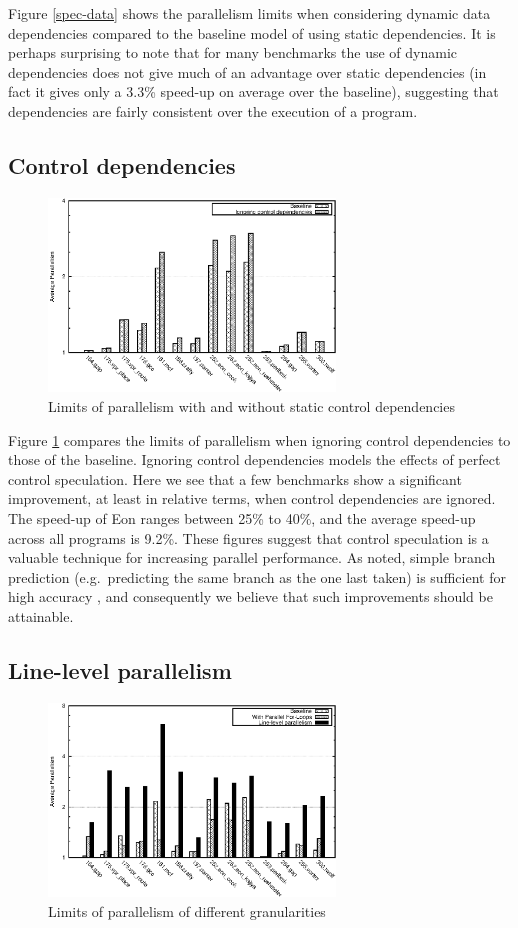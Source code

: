 Figure \ref{spec-data} shows the parallelism limits when considering dynamic data dependencies compared to the baseline model of using static dependencies.
It is perhaps surprising to note that for many benchmarks the use of dynamic dependencies does not give much of an advantage over static dependencies (in fact it gives only a 3.3\% speed-up on average over the baseline), suggesting that dependencies are fairly consistent over the execution of a program.

\subsection{Control dependencies}

\begin{figure}
 \centering
 \includegraphics[width=3in]{spec-ctl}
 \caption{Limits of parallelism with and without static control dependencies}
 \label{spec-ctl}
\end{figure}

Figure \ref{spec-ctl} compares the limits of parallelism when ignoring control dependencies to those of the baseline.
Ignoring control dependencies models the effects of perfect control speculation.
Here we see that a few benchmarks show a significant improvement, at least in relative terms, when control dependencies are ignored.
The speed-up of Eon ranges between 25\% to 40\%, and the average speed-up across all programs is 9.2\%.
These figures suggest that control speculation is a valuable technique for increasing parallel performance.
As noted, simple branch prediction (e.g.\ predicting the same branch as the one last taken) is sufficient for high accuracy \cite{smith98study}, and consequently we believe that such improvements should be attainable.

\subsection{Line-level parallelism}

\begin{figure}
 \centering
 \includegraphics[width=3in]{spec-gran}
 \caption{Limits of parallelism of different granularities}
 \label{spec-gran}
\end{figure}

